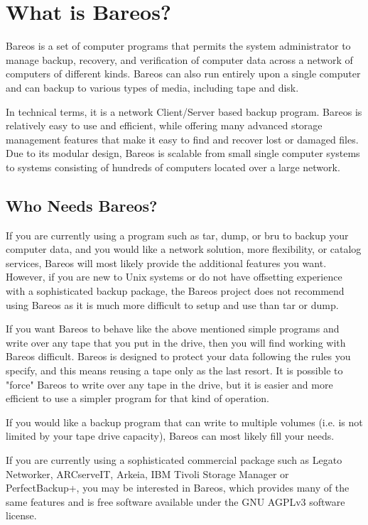 
\chapter{What is Bareos?}
\label{GeneralChapter}

Bareos is a set of computer programs that permits the system
administrator to manage backup, recovery, and verification of computer data
across a network of computers of different kinds. Bareos can also run entirely
upon a single computer and can backup to various types of media, including tape
and disk.

In technical terms, it is a
network Client/Server based backup program. Bareos is relatively easy to use
and efficient, while offering many advanced storage management features that
make it easy to find and recover lost or damaged files. Due to its modular
design, Bareos is scalable from small single computer systems to systems
consisting of hundreds of computers located over a large network.

\section{Who Needs Bareos?}

If you are currently using a program such as tar, dump, or
bru to backup your computer data, and you would like a network solution, more
flexibility, or catalog services, Bareos will most likely provide the
additional features you want. However, if you are new to Unix systems or do
not have offsetting experience with a sophisticated backup package, the Bareos project does not
recommend using Bareos as it is much more difficult to setup and use than
tar or dump.

If you want Bareos to behave like the above mentioned simple
programs and write over any tape that you put in the drive, then you will find
working with Bareos difficult. Bareos is designed to protect your data
following the rules you specify, and this means reusing a tape only
as the last resort. It is possible to "force" Bareos to write
over any tape in the drive, but it is easier and more efficient to use a
simpler program for that kind of operation.

If you would like a backup program that can write
to multiple volumes (i.e. is not limited by your tape drive capacity), Bareos
can most likely fill your needs.

If you are currently using a sophisticated commercial package such as Legato
Networker, ARCserveIT, Arkeia, IBM Tivoli Storage Manager or PerfectBackup+, you may be interested in
Bareos, which provides many of the same features and is free software
available under the GNU AGPLv3 software license.

